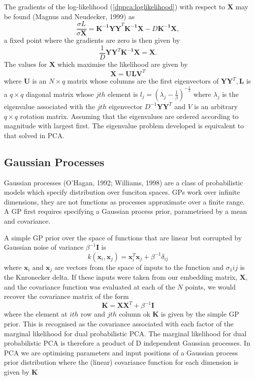 \documentclass[ %
                    author={Dillon Keith Diep},
                supervisor={Dr. Carl Henrik Ek},
                    degree={MEng},
                     title={Assisted Content Generation for 3D Hair Geometry},
                  subtitle={[INCOMPLETE DRAFT, CONTAINS NOTES FROM RESEARCH]},
                      type={Research},
                      year={2014} ]{dissertation}
\begin{document}
The gradients of the log-likelihood (\ref{dppca:loglikelihood}) with respect to $\mathbf{X}$ may be found (Magnus and Neudecker, 1999) as
$$\frac{\sigma L}{\sigma \mathbf{X}}=\mathbf{K^{-1}YY}^T\mathbf{K^{-1}X}-D\mathbf{K^{-1}X},$$
a fixed point where the gradients are zero is then given by 
$$\frac{1}{D}\mathbf{YY}^T\mathbf{K^{-1}X=X}.$$
The values for $\mathbf{X}$ which maximise the likelihood are given by 
$$\mathbf{X=ULV}^T$$
where $\mathbf{U}$ is an $N\times q$ matrix whose columns are the first eigenvectors of $\mathbf{YY}^T,\mathbf{L}$ is a $q\times q$ diagonal matrix whose $jth$ element is $l_j=(\lambda_j-\frac{1}{\beta})^{-\frac{1}{2}}$ where $\lambda_j$ is the eigenvalue associated with the $jth$ eigenvector $D^{-1}\mathbf{YY}^T$ and $V$ is an arbitrary $q\times q$ rotation matrix. Assuming that the eigenvalues are ordered according to magnitude with largest first. The eigenvalue problem developed is equivalent to that solved in PCA.

\subsection{Gaussian Processes}
Gaussian processes (O'Hagan, 1992; Williams, 1998) are a class of probabilistic models which specify distribution over funciton spaces.
GPs work over infinite dimensions, they are not functions as processes approximate over a finite range.
A GP first requires specifying a Gaussian process prior, parametrised by a mean and covariance.

A simple GP prior over the space of functions that are linear but corrupted by Gaussian noise of variance $\beta^{-1}\mathbf{I}$ is
$$k(\mathbf{x}_i,\mathbf{x}_j)=\mathbf{x}^T_i\mathbf{x}_j+\beta^{-1}\delta_{ij}$$
where $\mathbf{x}_i$ and $\mathbf{x}_j$ are vectors from the space of inputs to the function and $\sigma_1{ij}$ is the Knronecker delta. If these inputs were taken from our embedding matrix, $\mathbf{X}$, and the covariance function was evaluated at each of the $N$ points, we would recover the covariance matrix of the form
$$\mathbf{K=XX}^T+\beta^{-1}\mathbf{I}$$
where the element at $ith$ row and $jth$ column ok $\mathbf{K}$ is given by the simple GP prior. This is recognised as the covariance associated with each factor of the marginal likelihood for dual probabilistic PCA. The marginal likelihood for dual probabilistic PCA is therefore a product of D independent Gaussian processes. In PCA we are optimising parameters and input positions of a Gaussian process prior distribution where the (linear) covariance function for each dimension is given by $\mathbf{K}$
\end{document}
